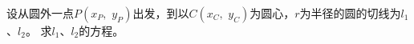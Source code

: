 \documentclass[12pt,UTF8,fontset=none]{ctexbook}
\begin{document}


\begin{ex}\label{ex:0-0-0}
    设从圆外一点$P(x_P, \,\,y_P)$出发，到以$C(x_C,\,\,y_C)$为圆心，$r$为半径的圆的切线为$l_1$、$l_2$。
    求$l_1$、$l_2$的方程。
\end{ex}
\end{document}
